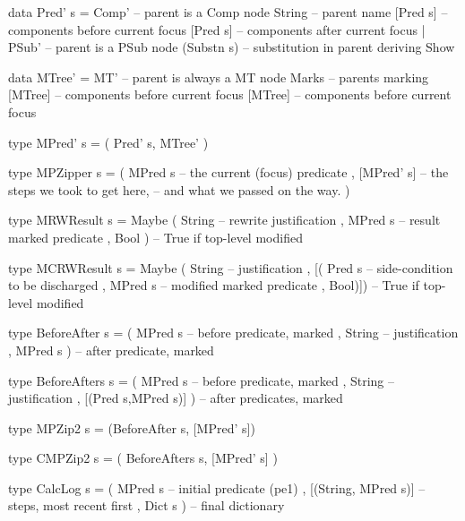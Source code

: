 \begin{code}
data Pred' s
 = Comp'        -- parent is a Comp node
     String       -- parent name
     [Pred s]     -- components before current focus
     [Pred s]     -- components after current focus
 | PSub'        -- parent is a PSub node
     (Substn s)   -- substitution in parent
 deriving Show

data MTree'
 = MT'       -- parent is always a MT node
     Marks     -- parents marking
     [MTree]   -- components before current focus
     [MTree]   -- components before current focus

type MPred' s = ( Pred' s, MTree' )

type MPZipper s
  = ( MPred s    -- the current (focus) predicate
    , [MPred' s] -- the steps we took to get here,
                   -- and what we passed on the way.
    )
\end{code}

\newpage
\begin{code}
type MRWResult s
 = Maybe ( String  -- rewrite justification
         , MPred s  -- result marked predicate
         , Bool )  -- True if top-level modified

type MCRWResult s
 = Maybe ( String      -- justification
         , [( Pred s   -- side-condition to be discharged
            , MPred s   -- modified marked predicate
            , Bool)])  -- True if top-level modified
\end{code}


\begin{code}
type BeforeAfter s
 = ( MPred s   -- before predicate, marked
   , String      -- justification
   , MPred s ) -- after predicate, marked
\end{code}

\begin{code}
type BeforeAfters s
 = ( MPred s   -- before predicate, marked
   , String      -- justification
   , [(Pred s,MPred s)] ) -- after predicates, marked
\end{code}

\begin{code}
type MPZip2 s = (BeforeAfter s, [MPred' s])
\end{code}

\begin{code}
type CMPZip2 s = ( BeforeAfters s, [MPred' s] )
\end{code}

\begin{code}
type CalcLog s = ( MPred s      -- initial predicate (pe1)
                 , [(String, MPred s)] -- steps, most recent first
                 , Dict s )     -- final dictionary
\end{code}
